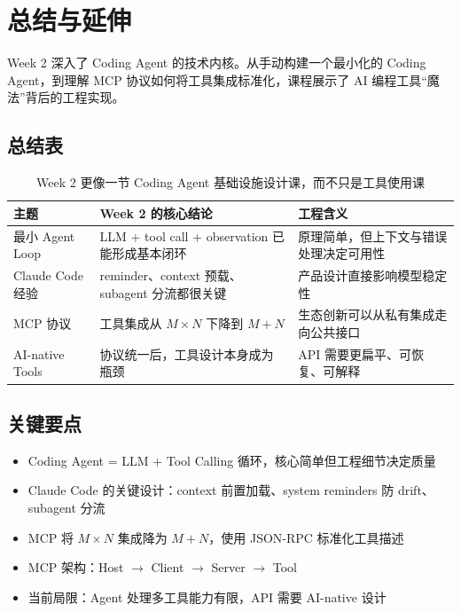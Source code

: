 \documentclass[a4paper]{article}
\begin{document}
\section{总结与延伸}

Week 2 深入了 Coding Agent 的技术内核。从手动构建一个最小化的 Coding Agent，到理解 MCP 协议如何将工具集成标准化，课程展示了 AI 编程工具``魔法''背后的工程实现。

\subsection{总结表}

\begin{table}[H]
\centering
\begin{tabular}{p{2.8cm}p{4.2cm}p{4.0cm}}
\toprule
\textbf{主题} & \textbf{Week 2 的核心结论} & \textbf{工程含义} \\
\midrule
最小 Agent Loop & LLM + tool call + observation 已能形成基本闭环 & 原理简单，但上下文与错误处理决定可用性 \\
Claude Code 经验 & reminder、context 预载、subagent 分流都很关键 & 产品设计直接影响模型稳定性 \\
MCP 协议 & 工具集成从 $M \times N$ 下降到 $M + N$ & 生态创新可以从私有集成走向公共接口 \\
AI-native Tools & 协议统一后，工具设计本身成为瓶颈 & API 需要更扁平、可恢复、可解释 \\
\bottomrule
\end{tabular}
\caption{Week 2 更像一节 Coding Agent 基础设施设计课，而不只是工具使用课}
\end{table}

\subsection{关键要点}

\begin{itemize}
    \item Coding Agent = LLM + Tool Calling 循环，核心简单但工程细节决定质量
    \item Claude Code 的关键设计：context 前置加载、system reminders 防 drift、subagent 分流
    \item MCP 将 $M \times N$ 集成降为 $M + N$，使用 JSON-RPC 标准化工具描述
    \item MCP 架构：Host $\rightarrow$ Client $\rightarrow$ Server $\rightarrow$ Tool
    \item 当前局限：Agent 处理多工具能力有限，API 需要 AI-native 设计
\end{itemize}
\end{document}
